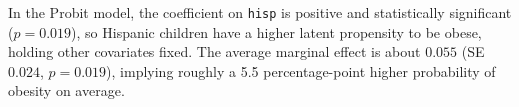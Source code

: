 ﻿\noindent In the Probit model, the coefficient on \texttt{hisp} is positive and statistically significant (\(p=0.019\)), so Hispanic children have a higher latent propensity to be obese, holding other covariates fixed. The average marginal effect is about \(0.055\) (SE \(0.024\), \(p=0.019\)), implying roughly a 5.5 percentage-point higher probability of obesity on average.
